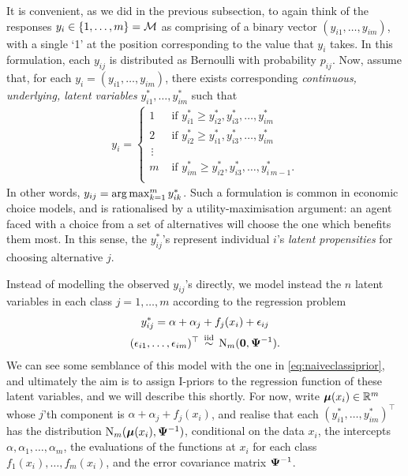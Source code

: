 It is convenient, as we did in the previous subsection, to again think of the responses $y_i \in \{1,\dots,m\} = {\mathcal M}$ as comprising of a binary vector $(y_{i1},\dots,y_{im})$, with a single `1' at the position corresponding to the value that $y_i$ takes. 
In this formulation, each $y_{ij}$ is distributed as Bernoulli with probability $p_{ij}$. Now, assume that, for each $y_i = (y_{i1}, \dots, y_{im})$, there exists corresponding \emph{continuous, underlying, latent variables} $y_{i1}^*, \dots, y_{im}^*$ such that
\begin{align}\label{eq:latentmodel}
  y_i =
  \begin{cases}
    1 &\text{ if } y_{i1}^* \geq y_{i2}^*, y_{i3}^*, \dots, y_{im}^* \\
    2 &\text{ if } y_{i2}^* \geq y_{i1}^*, y_{i3}^*, \dots, y_{im}^* \\
    \,\vdots \\
    m &\text{ if } y_{im}^* \geq y_{i2}^*, y_{i3}^*, \dots, y_{i\,m-1}^*. \\
  \end{cases}  
\end{align}
In other words, 
$y_{ij} = \operatorname*{arg\,max}_{k=1}^m y_{ik}^*$.
Such a formulation is common in economic choice models, and is rationalised by a utility-maximisation argument: an agent faced with a choice from a set of alternatives will choose the one which benefits them most.
In this sense, the $y_{ij}^*$'s represent individual $i$'s \emph{latent propensities} for choosing alternative $j$.

Instead of modelling the observed $y_{ij}$'s directly, we model instead the $n$ latent variables in each class $j=1,\dots,m$ according to the regression problem
\begin{equation}\label{eq:multinomial-latent}
  \begin{gathered}
    y_{ij}^* = \alpha + \alpha_j + f_j(x_i) + \epsilon_{ij} \\
    (\epsilon_{i1}, \dots, \epsilon_{im})^\top  \,\overset{\text{iid}}{\sim}\, \operatorname{N}_m({\mathbf 0}, {\bm\Psi}^{-1}). 
  \end{gathered}
\end{equation}
We can see some semblance of this model with the one in \cref{eq:naiveclassiprior}, and ultimately the aim is to assign I-priors to the regression function of these latent variables, and we will describe this shortly.
For now, write ${\bm\mu}(x_i) \in \mathbb{R}^m$ whose $j$'th component is $\alpha + \alpha_j + f_j(x_i)$, and realise that each $(y_{i1}^*, \dots, y_{im}^*)^\top$ has the distribution $\operatorname{N}_m({\bm\mu}(x_i), {\bm\Psi}^{-1})$, conditional on the data $x_i$,  the intercepts $\alpha,\alpha_1,\dots,\alpha_m$, the evaluations of the functions at $x_i$ for each class $f_1(x_i), \dots, f_m(x_i)$, and the error covariance matrix ${\bm\Psi}^{-1}$.

